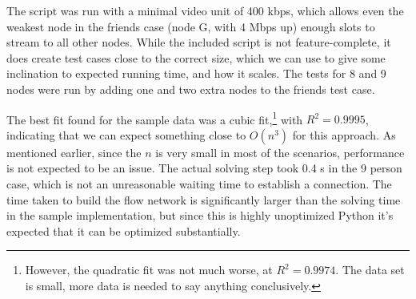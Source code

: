 The script was run with a minimal video unit of 400 kbps, which allows even the weakest node in the friends case (node G, with 4 Mbps up) enough slots to stream to all other nodes. While the included script is not feature-complete, it does create test cases close to the correct size, which we can use to give some inclination to expected running time, and how it scales. The tests for 8 and 9 nodes were run by adding one and two extra nodes to the friends test case.

The best fit found for the sample data was a cubic fit,\footnote{However, the quadratic fit was not much worse, at $R^2=0.9974$. The data set is small, more data is needed to say anything conclusively.} with $R^2=0.9995$, indicating that we can expect something close to $O(n^3)$ for this approach. As mentioned earlier, since the $n$ is very small in most of the scenarios, performance is not expected to be an issue. The actual solving step took 0.4 s in the 9 person case, which is not an unreasonable waiting time to establish a connection. The time taken to build the flow network is significantly larger than the solving time in the sample implementation, but since this is highly unoptimized Python it's expected that it can be optimized substantially.
